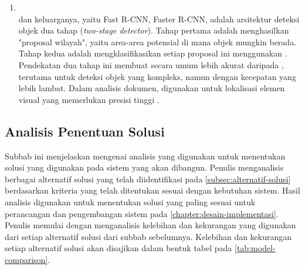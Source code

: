 \begin{enumerate}
    \item \rcnn{} ~\\ \rcnn{} dan keluarganya, yaitu Fast R-CNN, Faster R-CNN, adalah arsitektur deteksi objek dua tahap (\textit{two-stage detector}). Tahap pertama adalah menghasilkan "proposal wilayah", yaitu area-area potensial di mana objek mungkin berada. Tahap kedua adalah mengklasifikasikan setiap proposal ini menggunakan \cnn. Pendekatan dua tahap ini membuat \rcnn{} secara umum lebih akurat daripada \yolo, terutama untuk deteksi objek yang kompleks, namun dengan kecepatan yang lebih lambat. Dalam analisis dokumen, \rcnn{} digunakan untuk lokalisasi elemen visual yang memerlukan presisi tinggi \parencite{xie2021oriented}.
\end{enumerate}

\subsection{Analisis Penentuan Solusi}
\label{subsec:analisis-penentuan-solusi}

Subbab ini menjelaskan mengenai analisis yang digunakan untuk menentukan solusi yang digunakan pada sistem yang akan dibangun. Penulis menganalisis berbagai alternatif solusi yang telah diidentifikasi pada \autoref{subsec:alternatif-solusi} berdasarkan kriteria yang telah ditentukan sesuai dengan kebutuhan sistem. Hasil analisis digunakan untuk menentukan solusi yang paling sesuai untuk perancangan dan pengembangan sistem pada \autoref{chapter:desain-implementasi}. Penulis memulai dengan menganalisis kelebihan dan kekurangan yang digunakan dari setiap alternatif solusi dari subbab sebelumnya. Kelebihan dan kekurangan setiap alternatif solusi akan disajikan dalam bentuk tabel pada \autoref{tab:model-comparison}. 

